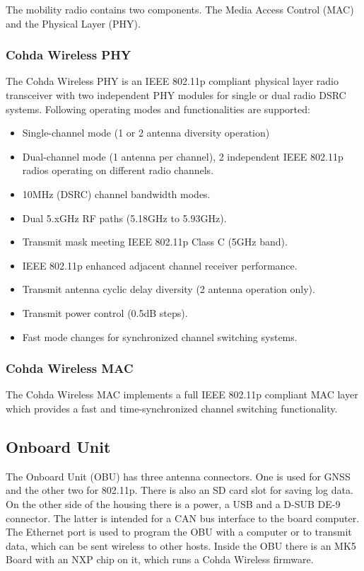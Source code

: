 The mobility radio contains two components. The Media Access Control (MAC) and the Physical Layer (PHY).

\subsubsection{Cohda Wireless PHY}

The Cohda Wireless PHY is an IEEE 802.11p compliant physical layer radio transceiver with two independent PHY modules for single or dual radio DSRC systems. Following operating modes and functionalities are supported:
\begin{itemize}
	\item Single-channel mode (1 or 2 antenna diversity operation)
	\item Dual-channel mode (1 antenna per channel), 2 independent IEEE 802.11p radios operating on different radio channels.
	\item 10\;MHz (DSRC) channel bandwidth modes.
	\item Dual 5.x\;GHz RF paths (5.18\;GHz to 5.93\;GHz).
	\item Transmit mask meeting IEEE 802.11p Class C (5\;GHz band).
	\item IEEE 802.11p enhanced adjacent channel receiver performance.
	\item Transmit antenna cyclic delay diversity (2 antenna operation only).
	\item Transmit power control (0.5\;dB steps).
	\item Fast mode changes for synchronized channel switching systems.
\end{itemize}

\subsubsection{Cohda Wireless MAC}

The Cohda Wireless MAC implements a full IEEE 802.11p compliant MAC layer which provides a fast and time-synchronized channel switching functionality. \cite{MK5_Datasheet}

\newpage

\subsection{Onboard Unit}

The Onboard Unit (OBU) has three antenna connectors. One is used for GNSS and the other two for 802.11p. There is also an SD card slot for saving log data. On the other side of the housing there is a power, a USB and a D-SUB DE-9 connector. The latter is intended for a CAN bus interface to the board computer. The Ethernet port is used to program the OBU with a computer or to transmit data, which can be sent wireless to other hosts. Inside the OBU there is an MK5 Board with an NXP chip on it, which runs a Cohda Wireless firmware. \cite{Cohda_Wireless_Hardware}

